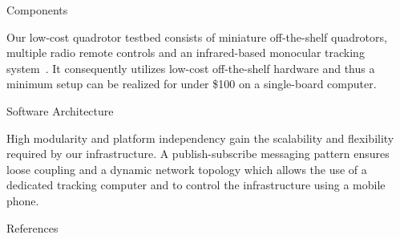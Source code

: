 \documentclass[final,hyperref={pdfpagelabels=false}]{beamer}
\newcommand{\blocktextwidth}{0.93\textwidth}
\begin{document}
\begin{frame}[t]
\begin{columns}[t]
\begin{column}{.31\textwidth}
            
\begin{block}{Components}
\begin{minipage}[]{\blocktextwidth}
Our low-cost quadrotor testbed consists of miniature off-the-shelf quadrotors, multiple radio remote controls and an infrared-based monocular tracking system~\cite{tjaden2014}.
It consequently utilizes low-cost off-the-shelf hardware and thus a minimum setup can be realized for under \$100 on a single-board computer.
\end{minipage}
\end{block}


\begin{block}{Software Architecture}
\begin{minipage}[]{\blocktextwidth}
High modularity and platform independency gain the scalability and flexibility required by our infrastructure. 
A publish-subscribe messaging pattern ensures loose coupling and a dynamic network topology which allows the use of a dedicated tracking computer and to control the infrastructure using a mobile phone.
\end{minipage}

\begin{figure}[htbp]
\centering
\resizebox{0.9\columnwidth}{!}{}
\end{figure}

\end{block}

\vspace{-0.7em}


{

\begin{block}{References}
\vspace{-.5\baselineskip}

\scriptsize{}
\end{block}
}


\end{column} %


\end{columns}
\end{frame}
\end{document}
